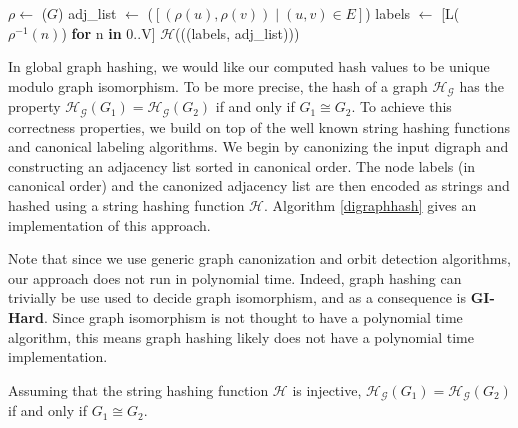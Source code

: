 \documentclass[twoside,leqno]{article}
\begin{document}

\begin{algorithm}[b]
    \caption{Global Digraph Hash}\label{digraphhash}
    \begin{algorithmic}[1]
        \State {}
        \State $\rho \gets$ ($G$) 
        \State adj\_list $\gets$ ($[(\rho(u), \rho(v)) \mid (u,v) \in E]$)
        \State labels $\gets$ [L($\rho^{-1}(n)$) \textbf{for} n \textbf{in} 0..\textbar V\textbar]
        \State \Return $\mathcal{H}$(((labels, adj\_list))) 
    \EndFunction
    \end{algorithmic}
\end{algorithm}

In global graph hashing, we would like our computed hash values to be unique modulo graph isomorphism. To be more precise, the hash of a graph $\mathcal{H_G}$ has the property $\mathcal{H_G}(G_1)=\mathcal{H_G}(G_2)$ if and only if $G_1 \cong G_2$. To achieve this correctness properties, we build on top of the well known string hashing functions and canonical labeling algorithms. We begin by canonizing the input digraph and constructing an adjacency list sorted in canonical order. The node labels (in canonical order) and the canonized adjacency list are then encoded as strings and hashed using a string hashing function $\mathcal{H}$. Algorithm \ref{digraphhash} gives an implementation of this approach.

Note that since we use generic graph canonization and orbit detection algorithms, our approach does not run in polynomial time. Indeed, graph hashing can trivially be use used to decide graph isomorphism, and as a consequence is \textbf{GI-Hard}. Since graph isomorphism is not thought to have a polynomial time algorithm, this means graph hashing likely does not have a polynomial time implementation.

\begin{theorem}
\label{thm:digraphhashcorrect}
Assuming that the string hashing function $\mathcal{H}$ is injective, $\mathcal{H_G}(G_1)=\mathcal{H_G}(G_2)$ if and only if $G_1 \cong G_2$.
\end{theorem}
\end{document}
